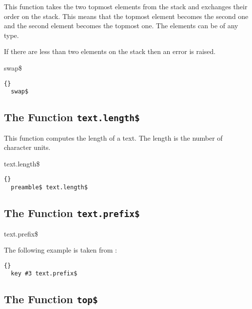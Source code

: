 This function takes the two topmost elements from the stack and
exchanges their order on the stack. This means that the topmost
element becomes the second one and the second element becomes the
topmost one. The elements can be of any type.

If there are less than two elements on the stack then an error is
raised.

\begin{BstFunction}{swap\$}
\end{BstFunction}

\begin{lstlisting}{}
  swap$
\end{lstlisting}


\subsection{The Function \texttt{text.length\$}}%

This function computes the length of a text. The length is the number
of character units.

\INCOMPLETE

\begin{BstFunction}{text.length\$}
\end{BstFunction}

\begin{lstlisting}{}
  preamble$ text.length$
\end{lstlisting}


\subsection{The Function \texttt{text.prefix\$}}%

\INCOMPLETE

\begin{BstFunction}{text.prefix\$}
\end{BstFunction}

The following example is taken from :

\begin{lstlisting}{}
  key #3 text.prefix$
\end{lstlisting}


\subsection{The Function \texttt{top\$}}%

